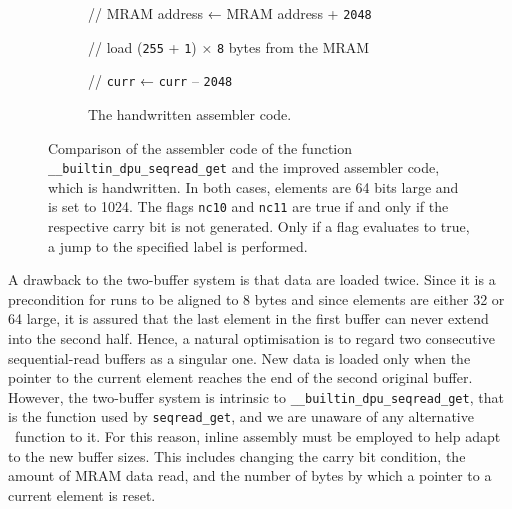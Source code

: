 \begin{figure}[t]
\begin{subfigure}{\textwidth}
\begin{minipage}{ \widthof{// \lstinline|curr| ← \lstinline|curr| + \lstinline|8|; jump if no 10th carry bit} }
			// \ac{MRAM} address ← \ac{MRAM} address + \lstinline|2048|

			// load (\lstinline|255| + \lstinline|1|) × \lstinline|8| bytes from the \ac{MRAM}

			// \lstinline|curr| ← \lstinline|curr| – \lstinline|2048|

			\phantom{lg}
		\end{minipage}

		\caption{
			The handwritten assembler code.
		}
		\label{fig:merge:assembler:manual}
	\end{subfigure}

	\caption{
		Comparison of the assembler code of the function \lstinline|__builtin_dpu_seqread_get| and the improved assembler code, which is handwritten.
		In both cases, elements are 64 bits large and \seqreadcachesize{} is set to 1024.
		The flags \lstinline|nc10| and \lstinline|nc11| are true if and only if the respective carry bit is not generated.
		Only if a flag evaluates to true, a jump to the specified label is performed.
	}
	\label{fig:merge:assembler}
\end{figure}

A drawback to the two-buffer system is that data are loaded twice.
Since it is a precondition for runs to be aligned to 8 bytes and since elements are either \qty{32}{\bits} or \qty{64}{\bits} large, it is assured that the last element in the first buffer can never extend into the second half.
Hence, a natural optimisation is to regard two consecutive sequential-read buffers as a singular one.
New data is loaded only when the pointer to the current element reaches the end of the second original buffer.
However, the two-buffer system is intrinsic to \lstinline|__builtin_dpu_seqread_get|, that is the function used by \lstinline|seqread_get|, and we are unaware of any alternative \langC{}~function to it.
For this reason, inline assembly must be employed to help adapt to the new buffer sizes.
This includes changing the carry bit condition, the amount of \ac{MRAM} data read, and the number of bytes by which a pointer to a current element is reset.

